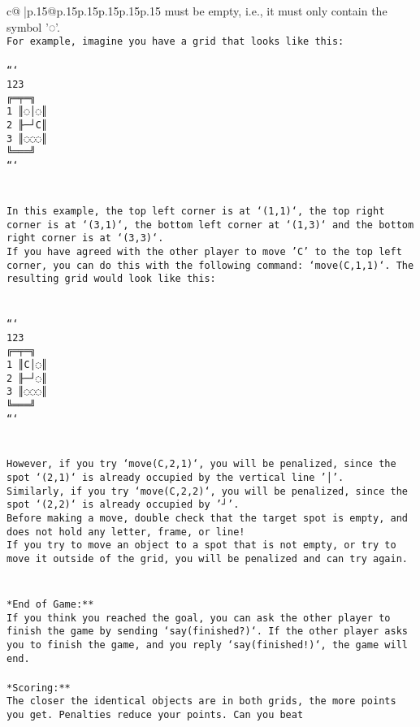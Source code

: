 \documentclass{article}
\begin{document}
{\begin{supertabular}{c@{$\;$}|p{.15\linewidth}@{}p{.15\linewidth}p{.15\linewidth}p{.15\linewidth}p{.15\linewidth}p{.15\linewidth}}
{{{must be empty, i.e., it must only contain the symbol '◌'.\\ \tt * For example, imagine you have a grid that looks like this: \\ \tt \\ \tt ```\\ \tt     123\\ \tt    ╔═╤═╗\\ \tt  1 ║◌│◌║\\ \tt  2 ╟─┘C║\\ \tt  3 ║◌◌◌║\\ \tt    ╚═══╝\\ \tt ```\\ \tt \\ \tt \\ \tt * In this example, the top left corner is at `(1,1)`, the top right corner is at `(3,1)`, the bottom left corner at `(1,3)` and the bottom right corner is at `(3,3)`.\\ \tt * If you have agreed with the other player to move 'C' to the top left corner, you can do this with the following command: `move(C,1,1)`. The resulting grid would look like this: \\ \tt \\ \tt \\ \tt ```\\ \tt     123\\ \tt    ╔═╤═╗\\ \tt  1 ║C│◌║\\ \tt  2 ╟─┘◌║\\ \tt  3 ║◌◌◌║\\ \tt    ╚═══╝\\ \tt ```\\ \tt \\ \tt \\ \tt * However, if you try `move(C,2,1)`, you will be penalized, since the spot `(2,1)` is already occupied by the vertical line '│'.\\ \tt * Similarly, if you try `move(C,2,2)`, you will be penalized, since the spot `(2,2)` is already occupied by '┘'.\\ \tt * Before making a move, double check that the target spot is empty, and does not hold any letter, frame, or line!\\ \tt * If you try to move an object to a spot that is not empty, or try to move it outside of the grid, you will be penalized and can try again.\\ \tt \\ \tt \\ \tt **End of Game:**\\ \tt If you think you reached the goal, you can ask the other player to finish the game by sending `say(finished?)`. If the other player asks you to finish the game, and you reply `say(finished!)`, the game will end.\\ \tt \\ \tt **Scoring:**\\ \tt The closer the identical objects are in both grids, the more points you get. Penalties reduce your points. Can you beat }}}
\end{supertabular}}
\end{document}
